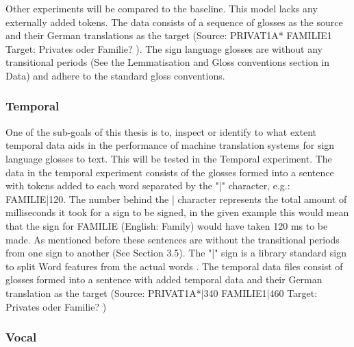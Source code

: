 Other experiments will be compared to the baseline. This model lacks any externally added tokens. The data consists of a sequence of glosses as the source and their German translations as the target (Source: PRIVAT1A* FAMILIE1 Target: Privates oder Familie? \cite{dgscorpus_3}). The sign language glosses are without any transitional periods (See the Lemmatisation and Gloss conventions section in Data) and adhere to the standard gloss conventions.


\subsubsection{Temporal}

One of the sub-goals of this thesis is to, inspect or identify to what extent temporal data aids in the performance of machine translation systems for sign language glosses to text. This will be tested in the Temporal experiment. The data in the temporal experiment consists of the glosses formed into a sentence with tokens added to each word separated by the "|" character, e.g.: FAMILIE|120. The number behind the | character represents the total amount of milliseconds it took for a sign to be signed, in the given example this would mean that the sign for FAMILIE (English: Family) would have taken 120 ms to be made. As mentioned before these sentences are without the transitional periods from one sign to another (See Section 3.5). The "|" sign is a library standard sign to split Word features from the actual words \cite{klein-etal-2017-opennmt}. The temporal data files consist of glosses formed into a sentence with added temporal data and their German translation as the target (Source: PRIVAT1A*|340 FAMILIE1|460 Target: Privates oder Familie? \cite{dgscorpus_3})

\subsubsection{Vocal}

